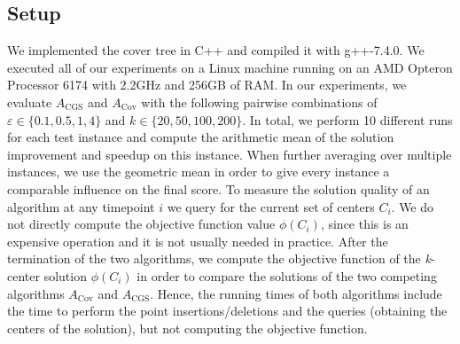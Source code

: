  \subsection{Setup}
    We implemented the cover tree in C++ and compiled it with g++-7.4.0. We executed all of our experiments on a Linux machine running on an AMD Opteron Processor 6174 with 2.2GHz and 256GB of RAM. In our experiments, we evaluate $A_{\text{CGS}}$ and $A_{\text{Cov}}$ with the following pairwise combinations of $\varepsilon \in \{0.1, 0.5, 1, 4\}$ and $k \in \{20, 50, 100, 200\}$. In total, we perform 10 different runs for each test instance and compute the arithmetic mean of the solution improvement and speedup on this instance. When further averaging over multiple instances, we use the geometric mean in order to give every instance a comparable influence on the final score. To measure the solution quality of an algorithm at any timepoint $i$ we query for the current set of centers $C_i$. We do not directly compute the objective function value $\phi(C_i)$, since this is an expensive operation and it is not usually needed in practice. After the termination of the two algorithms, we compute the objective function of the \textit{k}-center solution $\phi(C_i)$ in order to compare the solutions of the two competing algorithms $A_{\text{Cov}}$ and $A_{\text{CGS}}$. Hence, the running times of both algorithms include the time to perform the point insertions/deletions and the queries (obtaining the centers of the solution), but not computing the objective function.
